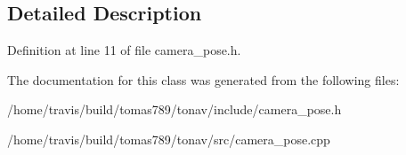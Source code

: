 \subsection{Detailed Description}


Definition at line 11 of file camera\-\_\-pose.\-h.



The documentation for this class was generated from the following files\-:\begin{DoxyCompactItemize}
\item 
/home/travis/build/tomas789/tonav/include/camera\-\_\-pose.\-h\item 
/home/travis/build/tomas789/tonav/src/camera\-\_\-pose.\-cpp\end{DoxyCompactItemize}
